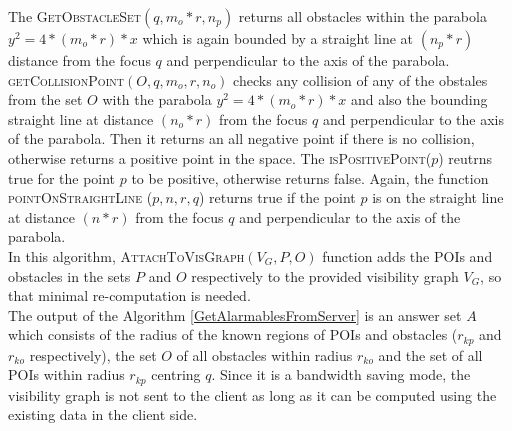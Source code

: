 \documentclass{sig-alternate}
\begin{document}
The \textsc{GetObstacleSet}$(q, m_o * r, n_p)$ returns all obstacles within the parabola $y^2 = 4*(m_o*r)*x$ which is again bounded by a straight line at $(n_p*r)$ distance from the focus $q$ and perpendicular to the axis of the parabola.\\

\textsc{getCollisionPoint}$(O, q, m_o, r, n_o)$ checks any collision of any of the obstales from the set $O$ with the parabola $y^2 = 4 * (m_o * r) * x$ and also the bounding straight line at distance $(n_o*r)$ from the focus $q$ and perpendicular to the axis of the parabola. Then it returns an all negative point if there is no collision, otherwise returns a positive point in the space. The \textsc{isPositivePoint}($p$) reutrns true for the point $p$ to be positive, otherwise returns false. Again, the function \textsc{pointOnStraightLine} ($p, n, r, q$) returns true if the point $p$ is on the straight line at distance $(n*r)$ from the focus $q$ and perpendicular to the axis of the parabola.\\

In this algorithm, \textsc{AttachToVisGraph}$(V_G, P, O)$ function adds the POIs and obstacles in the sets $P$ and $O$ respectively to the provided visibility graph $V_G$, so that minimal re-computation is needed.\\

The output of the Algorithm \ref{GetAlarmablesFromServer} is an answer set $A$ which consists of the radius of the known regions of POIs and obstacles ($r_{kp}$ and $r_{ko}$ respectively), the set $O$ of all obstacles within radius $r_{ko}$ and the set of all POIs within radius $r_{kp}$ centring $q$. Since it is a bandwidth saving mode, the visibility graph is not sent to the client as long as it can be computed using the existing data in the client side.\\
\end{document}
